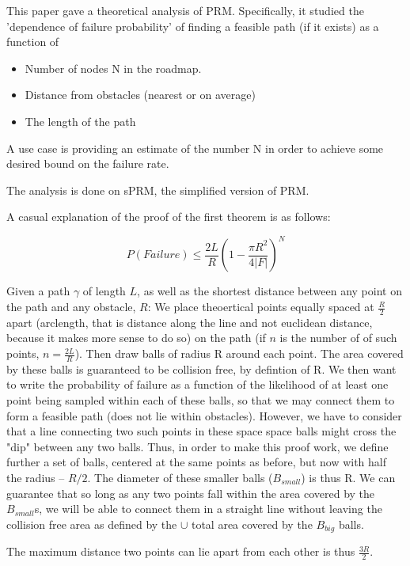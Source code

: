 \documentclass[a4paper]{article}
\begin{document}
This paper gave a theoretical analysis of PRM. Specifically, it studied the
'dependence of failure probability' of finding a feasible path (if it exists) as
a function of 
\begin{itemize}
    \item Number of nodes N in the roadmap.
    \item Distance from obstacles (nearest or on average) 
    \item The length of the path 
\end{itemize}

A use case is providing an estimate of the number N in order to achieve some
desired bound on the failure rate.

The analysis is done on sPRM, the simplified version of PRM.

A casual explanation of the proof of the first theorem is as follows:

\begin{equation}
    P(Failure) \leq \frac{2L}{R}\left( 1 - \frac{\pi R^2}{4|F|}\right)^N
\end{equation}

Given a path $\gamma$ of length $L$, as well as the shortest distance between
any point on the path and any obstacle, $R$: 
We place theoertical points equally spaced at $\frac{R}{2}$ apart (arclength, that is
distance along the line and not euclidean distance, because it makes more sense
to do so) on the path (if $n$ is the number of of such points, $n =
\frac{2L}{R}$). Then draw balls of radius R around each point. The area covered
by these balls is guaranteed to be collision free, by defintion of R. We then
want to write the probability of failure as a function of the likelihood of
at least one point being sampled within each of these balls, so that we may
connect them to form a feasible path (does not lie within obstacles). However,
we have to consider that a line connecting two such points in these space
space balls might cross the "dip" between any two balls. Thus, in order to make
this proof work, we define further a set of balls, centered at the same points
as before, but now with half the radius  -- $R/2$. The diameter of these smaller
balls ($B_{small}$) is thus R. We can guarantee that so long as any two points
fall within the area covered by the $B_{small}$s, we will be able to connect them in a straight line without leaving the collision free area as defined by the $\cup$ total area covered by the $B_{big}$ balls.  

The maximum distance two points can lie apart from each other is thus
$\frac{3R}{2}$. 
\end{document}
